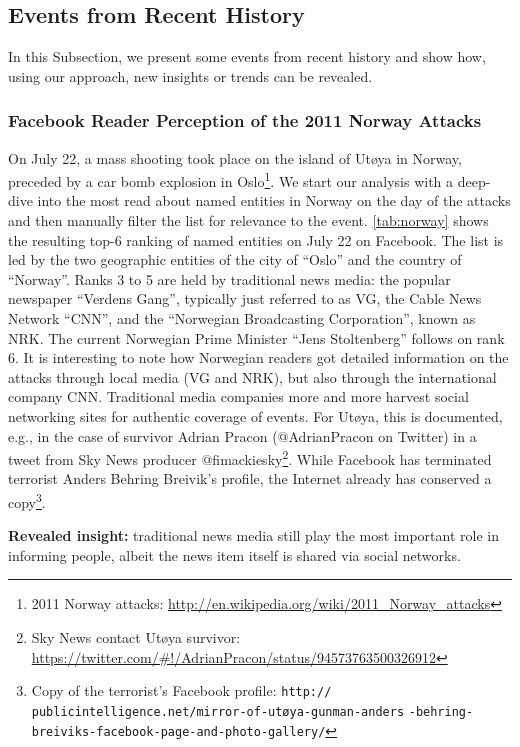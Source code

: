 \documentclass{iosart2c}
\begin{document}
\subsection{Events from Recent History}
\label{subsec:RecentEvents}
In this Subsection, we present some events from recent history and show how, using our approach, new insights or trends can be revealed.

\subsubsection{Facebook Reader Perception of the 2011 Norway Attacks}
On July 22, a mass shooting took place on the island of Utøya in Norway, preceded by a car bomb explosion in Oslo\footnote{2011 Norway attacks: \url{http://en.wikipedia.org/wiki/2011_Norway_attacks}}.
We start our analysis with a deep-dive into the most read about named entities in Norway on the day of the attacks and then manually filter the list for relevance to the event.
\autoref{tab:norway} shows the resulting \mbox{top-6} ranking of named entities on July 22 on Facebook.
The list is led by the two geographic entities of the city of ``Oslo'' and the country of ``Norway''.
Ranks 3 to 5 are held by traditional news media: the popular newspaper ``Verdens Gang'', typically just referred to as VG, the Cable News Network ``CNN'', and the ``Norwegian Broadcasting Corporation'', known as NRK.
The current Norwegian Prime Minister ``Jens Stoltenberg'' follows on rank 6.
It is interesting to note how Norwegian readers got detailed information on the attacks through local media (VG and NRK), but also through the international company CNN.
Traditional media companies more and more harvest social networking sites for authentic coverage of events.
For Utøya, this is documented, e.g., in the case of survivor Adrian Pracon (@AdrianPracon on Twitter) in a tweet from Sky News producer @fimackiesky\footnote{Sky News contact Utøya survivor: \url{https://twitter.com/\#!/AdrianPracon/status/94573763500326912}}.
While Facebook has terminated terrorist Anders Behring Breivik's profile, the Internet already has conserved a copy\footnote{Copy of the terrorist's Facebook profile: \scriptsize\texttt{http://} \texttt{publicintelligence.net/mirror-of-utøya-gunman-anders} \texttt{-behring-breiviks-facebook-page-and-photo-gallery/}}. 

\textbf{Revealed insight:}
traditional news media still play the most important role in informing people, albeit the news item itself is shared via social networks. 
\end{document}

